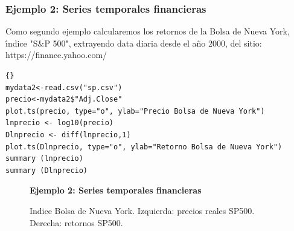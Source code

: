\subsubsection{Ejemplo 2: Series temporales financieras}
Como segundo ejemplo calcularemos los retornos de la Bolsa de Nueva York, \'\i{}ndice "S$\&$P 500", extrayendo data diaria desde el a\~no 2000, del sitio: https://finance.yahoo.com/\\

\begin{lstlisting}[title={‘Código R precio de la Bolsa de Nueva York.’},basicstyle=\ttfamily]{}
mydata2<-read.csv("sp.csv")
precio<-mydata2$"Adj.Close"
plot.ts(precio, type="o", ylab="Precio Bolsa de Nueva York")
lnprecio <- log10(precio)
Dlnprecio <- diff(lnprecio,1)
plot.ts(Dlnprecio, type="o", ylab="Retorno Bolsa de Nueva York")
summary (lnprecio)
summary (Dlnprecio)
\end{lstlisting}

\begin{figure}[h]{}
\centering
\textbf{Ejemplo 2: Series temporales financieras}\par\medskip
{}
\caption{Indice Bolsa de Nueva York. Izquierda: precios reales SP500. Derecha: retornos SP500.}\label{figura2}
\end{figure}


